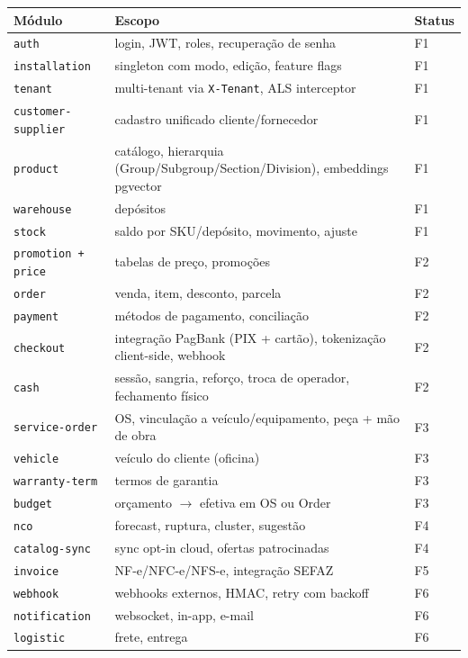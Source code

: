 \documentclass[11pt,a4paper]{article}
\begin{document}
\begin{longtable}{@{}p{3.5cm}p{6cm}p{4.5cm}@{}}
\toprule
\textbf{Módulo} & \textbf{Escopo} & \textbf{Status} \\
\midrule
\endhead
\texttt{auth} & login, JWT, roles, recuperação de senha & F1 \\
\texttt{installation} & singleton com modo, edição, feature flags & F1 \\
\texttt{tenant} & multi-tenant via \texttt{X-Tenant}, ALS interceptor & F1 \\
\texttt{customer-supplier} & cadastro unificado cliente/fornecedor & F1 \\
\texttt{product} & catálogo, hierarquia (Group/Subgroup/Section/Division),
embeddings pgvector & F1 \\
\texttt{warehouse} & depósitos & F1 \\
\texttt{stock} & saldo por SKU/depósito, movimento, ajuste & F1 \\
\texttt{promotion + price} & tabelas de preço, promoções & F2 \\
\texttt{order} & venda, item, desconto, parcela & F2 \\
\texttt{payment} & métodos de pagamento, conciliação & F2 \\
\texttt{checkout} & integração PagBank (PIX + cartão), tokenização
client-side, webhook & F2 \\
\texttt{cash} & sessão, sangria, reforço, troca de operador, fechamento
físico & F2 \\
\texttt{service-order} & OS, vinculação a veículo/equipamento, peça +
mão de obra & F3 \\
\texttt{vehicle} & veículo do cliente (oficina) & F3 \\
\texttt{warranty-term} & termos de garantia & F3 \\
\texttt{budget} & orçamento $\to$ efetiva em OS ou Order & F3 \\
\texttt{nco} & forecast, ruptura, cluster, sugestão & F4 \\
\texttt{catalog-sync} & sync opt-in cloud, ofertas patrocinadas & F4 \\
\texttt{invoice} & NF-e/NFC-e/NFS-e, integração SEFAZ & F5 \\
\texttt{webhook} & webhooks externos, HMAC, retry com backoff & F6 \\
\texttt{notification} & websocket, in-app, e-mail & F6 \\
\texttt{logistic} & frete, entrega & F6 \\
\bottomrule
\end{longtable}
\end{document}
